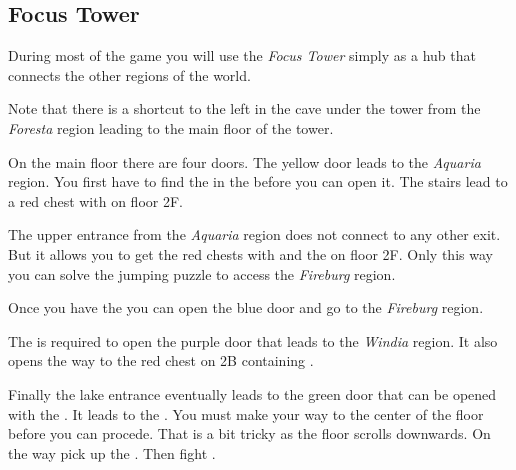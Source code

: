\subsection{Focus Tower}
\label{map:focus_tower}

During most of the game you will use the \textit{Focus Tower} simply as a hub that connects the other regions of the world.

Note that there is a shortcut to the left in the cave under the tower from the \textit{Foresta} region leading to the main floor of the tower.

On the main floor there are four doors. The yellow door leads to the \textit{Aquaria} region. You first have to find the  in the  before you can open it. The stairs lead to a red chest with  on floor 2F.

The upper entrance from the \textit{Aquaria} region does not connect to any other exit. But it allows you to get the red chests with  and the  on floor 2F. Only this way you can solve the jumping puzzle to access the \textit{Fireburg} region.

Once you have the  you can open the blue door and go to the \textit{Fireburg} region.

The  is required to open the purple door that leads to the \textit{Windia} region. It also opens the way to the red chest on 2B containing .

Finally the lake entrance eventually leads to the green door that can be opened with the . It leads to the . You must make your way to the center of the floor before you can procede. That is a bit tricky as the floor scrolls downwards. On the way pick up the . Then fight .


